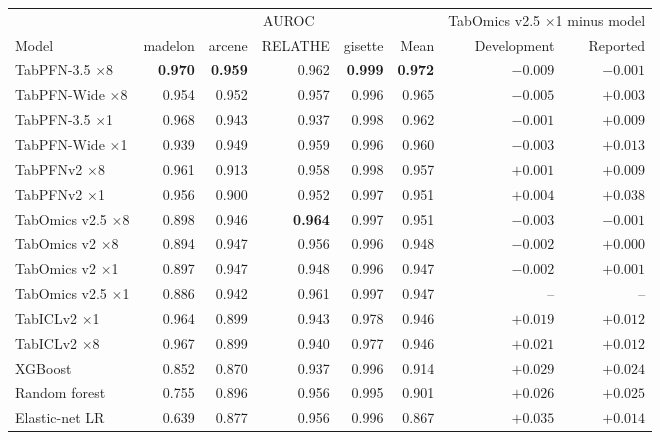 \begin{tabular}{lrrrrrrr}
\toprule
 & \multicolumn{5}{c}{AUROC} & \multicolumn{2}{c}{TabOmics v2.5 $\times$1 minus model} \\
\cmidrule(lr){2-6} \cmidrule(lr){7-8}
Model & madelon & arcene & RELATHE & gisette & Mean & Development & Reported \\
\midrule
TabPFN-3.5 $\times$8 & \textbf{0.970} & \textbf{0.959} & 0.962 & \textbf{0.999} & \textbf{0.972} & $-0.009$ & $-0.001$ \\
TabPFN-Wide $\times$8 & 0.954 & 0.952 & 0.957 & 0.996 & 0.965 & $-0.005$ & $+0.003$ \\
TabPFN-3.5 $\times$1 & 0.968 & 0.943 & 0.937 & 0.998 & 0.962 & $-0.001$ & $+0.009$ \\
TabPFN-Wide $\times$1 & 0.939 & 0.949 & 0.959 & 0.996 & 0.960 & $-0.003$ & $+0.013$ \\
TabPFNv2 $\times$8 & 0.961 & 0.913 & 0.958 & 0.998 & 0.957 & $+0.001$ & $+0.009$ \\
TabPFNv2 $\times$1 & 0.956 & 0.900 & 0.952 & 0.997 & 0.951 & $+0.004$ & $+0.038$ \\
TabOmics v2.5 $\times$8 & 0.898 & 0.946 & \textbf{0.964} & 0.997 & 0.951 & $-0.003$ & $-0.001$ \\
TabOmics v2 $\times$8 & 0.894 & 0.947 & 0.956 & 0.996 & 0.948 & $-0.002$ & $+0.000$ \\
TabOmics v2 $\times$1 & 0.897 & 0.947 & 0.948 & 0.996 & 0.947 & $-0.002$ & $+0.001$ \\
TabOmics v2.5 $\times$1 & 0.886 & 0.942 & 0.961 & 0.997 & 0.947 & -- & -- \\
TabICLv2 $\times$1 & 0.964 & 0.899 & 0.943 & 0.978 & 0.946 & $+0.019$ & $+0.012$ \\
TabICLv2 $\times$8 & 0.967 & 0.899 & 0.940 & 0.977 & 0.946 & $+0.021$ & $+0.012$ \\
XGBoost & 0.852 & 0.870 & 0.937 & 0.996 & 0.914 & $+0.029$ & $+0.024$ \\
Random forest & 0.755 & 0.896 & 0.956 & 0.995 & 0.901 & $+0.026$ & $+0.025$ \\
Elastic-net LR & 0.639 & 0.877 & 0.956 & 0.996 & 0.867 & $+0.035$ & $+0.014$ \\
\bottomrule
\end{tabular}
